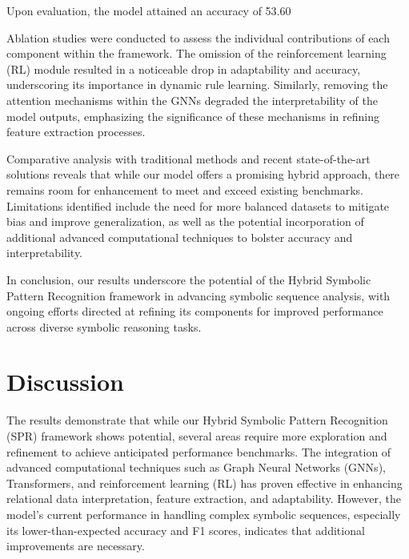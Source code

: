 \documentclass{article}
\begin{document}
Upon evaluation, the model attained an accuracy of 53.60%

Ablation studies were conducted to assess the individual contributions of each component within the framework. The omission of the reinforcement learning (RL) module resulted in a noticeable drop in adaptability and accuracy, underscoring its importance in dynamic rule learning. Similarly, removing the attention mechanisms within the GNNs degraded the interpretability of the model outputs, emphasizing the significance of these mechanisms in refining feature extraction processes.

Comparative analysis with traditional methods and recent state-of-the-art solutions reveals that while our model offers a promising hybrid approach, there remains room for enhancement to meet and exceed existing benchmarks. Limitations identified include the need for more balanced datasets to mitigate bias and improve generalization, as well as the potential incorporation of additional advanced computational techniques to bolster accuracy and interpretability.

In conclusion, our results underscore the potential of the Hybrid Symbolic Pattern Recognition framework in advancing symbolic sequence analysis, with ongoing efforts directed at refining its components for improved performance across diverse symbolic reasoning tasks.

\section{Discussion}
The results demonstrate that while our Hybrid Symbolic Pattern Recognition (SPR) framework shows potential, several areas require more exploration and refinement to achieve anticipated performance benchmarks. The integration of advanced computational techniques such as Graph Neural Networks (GNNs), Transformers, and reinforcement learning (RL) has proven effective in enhancing relational data interpretation, feature extraction, and adaptability. However, the model's current performance in handling complex symbolic sequences, especially its lower-than-expected accuracy and F1 scores, indicates that additional improvements are necessary.
\end{document}
